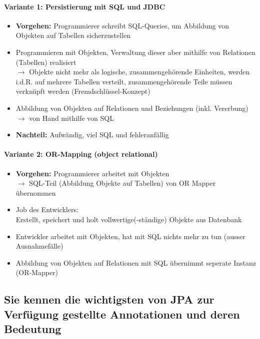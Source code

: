 \documentclass[a4paper]{article}
\begin{document}
				\paragraph{Variante 1: Persistierung mit SQL und JDBC}
				
					\begin{itemize}
						\item \textbf{Vorgehen:} Programmierer schreibt SQL-Queries, um Abbildung von Objekten auf Tabellen sicherzustellen
						\item Programmieren mit Objekten, Verwaltung dieser aber mithilfe von Relationen (Tabellen) realisiert \\
						$\rightarrow$ Objekte nicht mehr als logische, zusammengehörende Einheiten, werden i.d.R. auf mehrere Tabellen verteilt, zusammengehörende Teile müssen verknüpft werden (Fremdschlüssel-Konzept)
						\item Abbildung von Objekten auf Relationen und Beziehungen (inkl. Vererbung)\\
						$\rightarrow$ von Hand mithilfe von SQL
						\item \textbf{Nachteil:} Aufwändig, viel SQL und fehleranfällig
					\end{itemize}
				
				\paragraph{Variante 2: OR-Mapping (object relational)}
				
					\begin{itemize}
						\item \textbf{Vorgehen:} Programmierer arbeitet mit Objekten\\
						$\rightarrow$ SQL-Teil (Abbildung Objekte auf Tabellen) von OR Mapper übernommen
						\item Job des Entwicklers:\\
						Erstellt, speichert und holt vollwertige(-ständige) Objekte aus Datenbank
						\item Entwickler arbeitet mit Objekten, hat mit SQL nichts mehr zu tun (ausser Ausnahmefälle)
						\item Abbildung von Objekten auf Relationen mit SQL übernimmt seperate Instanz (OR-Mapper)
					\end{itemize}
		
		\subsection{Sie kennen die wichtigsten von JPA zur Verfügung gestellte Annotationen und deren Bedeutung}
		
\end{document}
